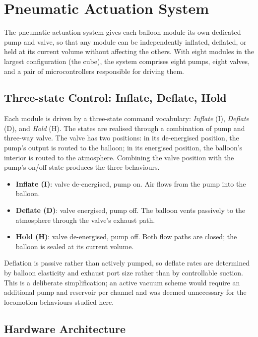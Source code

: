 \section{Pneumatic Actuation System}
\label{sec:pneumatic-system}

The pneumatic actuation system gives each balloon module its own dedicated pump and valve, so that any module can be independently inflated, deflated, or held at its current volume without affecting the others. With eight modules in the largest configuration (the cube), the system comprises eight pumps, eight valves, and a pair of microcontrollers responsible for driving them.

\subsection{Three-state Control: Inflate, Deflate, Hold}
\label{subsec:three-state-control}

Each module is driven by a three-state command vocabulary: \textit{Inflate} (I), \textit{Deflate} (D), and \textit{Hold} (H). The states are realised through a combination of pump and three-way valve. The valve has two positions: in its de-energised position, the pump's output is routed to the balloon; in its energised position, the balloon's interior is routed to the atmosphere. Combining the valve position with the pump's on/off state produces the three behaviours.

\begin{itemize}
  \item \textbf{Inflate (I)}: valve de-energised, pump on. Air flows from the pump into the balloon.
  \item \textbf{Deflate (D)}: valve energised, pump off. The balloon vents passively to the atmosphere through the valve's exhaust path.
  \item \textbf{Hold (H)}: valve de-energised, pump off. Both flow paths are closed; the balloon is sealed at its current volume.
\end{itemize}

Deflation is passive rather than actively pumped, so deflate rates are determined by balloon elasticity and exhaust port size rather than by controllable suction. This is a deliberate simplification; an active vacuum scheme would require an additional pump and reservoir per channel and was deemed unnecessary for the locomotion behaviours studied here.

\subsection{Hardware Architecture}
\label{subsec:pneumatic-hardware}

